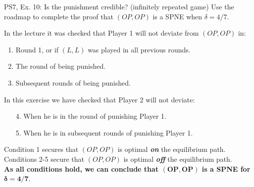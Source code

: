 \begin{frame}{PS7, Ex. 10: Is the punishment credible? (infinitely repeated game)}
  Use the roadmap to complete the proof that $(OP,OP)$ is a SPNE when $\delta=4/7$.\vspace{-4pt}
  \begin{multicols}{2}
    In the lecture it was checked that Player 1 will not deviate from $(OP,OP)$ in:
    \begin{enumerate}
      \item Round 1, or if $(L,L)$ was played in all previous rounds.
      \item The  round of being punished.
      \item Subsequent rounds of being punished.
    \end{enumerate}
    In this exercise we have checked that Player 2 will not deviate:
    \begin{itemize}
      \item[4.] When he is in the  round of punishing Player 1.
      \item[5.] When he is in subsequent rounds of punishing Player 1.
    \end{itemize}
    \vfill\null\columnbreak
    Condition 1 secures that $(OP,OP)$ is optimal \textbf{\textit{on}} the equilibrium path.\\\medskip
    Conditions 2-5 secure that $(OP,OP)$ is optimal \textbf{\textit{off}} the equilibrium path.\\\medskip
    \textbf{As all conditions hold, we can conclude that $\bm{(OP,OP)}$ is a SPNE for $\bm{\delta = 4/7}$}.
    \vfill\null
  \end{multicols}
  \vfill\null
\end{frame}
